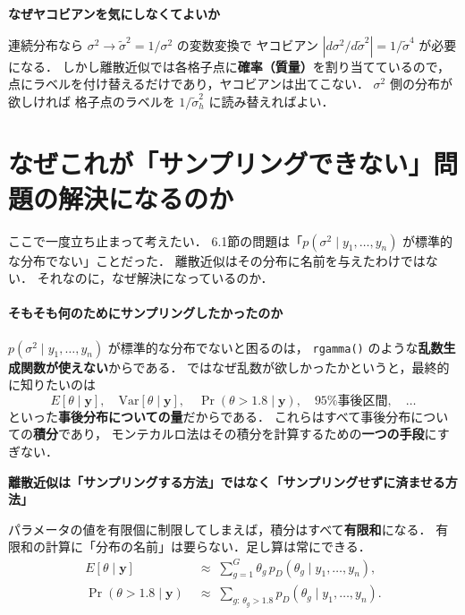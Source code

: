 \documentclass[lualatex,ja=standard,a4paper,12pt]{bxjsarticle}
\begin{document}
\begin{pointbox}
\textbf{なぜヤコビアンを気にしなくてよいか}

連続分布なら $\sigma^2 \to \tilde{\sigma}^2 = 1/\sigma^2$ の変数変換で
ヤコビアン $|d\sigma^2/d\tilde{\sigma}^2| = 1/\tilde{\sigma}^4$ が必要になる．
しかし離散近似では各格子点に\textbf{確率（質量）}を割り当てているので，
点にラベルを付け替えるだけであり，ヤコビアンは出てこない．
$\sigma^2$ 側の分布が欲しければ
格子点のラベルを $1/\tilde{\sigma}_h^2$ に読み替えればよい．
\end{pointbox}

\section{なぜこれが「サンプリングできない」問題の解決になるのか}

ここで一度立ち止まって考えたい．
6.1節の問題は「$p(\sigma^2 \mid y_1,\ldots,y_n)$ が標準的な分布でない」ことだった．
離散近似はその分布に名前を与えたわけではない．
それなのに，なぜ解決になっているのか．

\paragraph{そもそも何のためにサンプリングしたかったのか}
$p(\sigma^2 \mid y_1,\ldots,y_n)$ が標準的な分布でないと困るのは，
\texttt{rgamma()} のような\textbf{乱数生成関数が使えない}からである．
ではなぜ乱数が欲しかったかというと，最終的に知りたいのは
\[
  E[\theta \mid \boldsymbol{y}], \quad
  \mathrm{Var}[\theta \mid \boldsymbol{y}], \quad
  \Pr(\theta > 1.8 \mid \boldsymbol{y}), \quad
  \text{95\% 事後区間}, \quad \ldots
\]
といった\textbf{事後分布についての量}だからである．
これらはすべて事後分布についての\textbf{積分}であり，
モンテカルロ法はその積分を計算するための\textbf{一つの手段}にすぎない．

\begin{pointbox}
\textbf{離散近似は「サンプリングする方法」ではなく「サンプリングせずに済ませる方法」}

パラメータの値を有限個に制限してしまえば，積分はすべて\textbf{有限和}になる．
有限和の計算に「分布の名前」は要らない．足し算は常にできる．
\begin{align*}
  E[\theta \mid \boldsymbol{y}]
  &\;\approx\; \sum_{g=1}^{G} \theta_g \, p_D(\theta_g \mid y_1,\ldots,y_n), \\[4pt]
  \Pr(\theta > 1.8 \mid \boldsymbol{y})
  &\;\approx\; \sum_{g:\,\theta_g > 1.8} p_D(\theta_g \mid y_1,\ldots,y_n).
\end{align*}
\end{pointbox}
\end{document}
